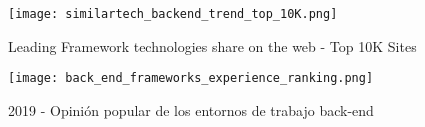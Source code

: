 \begin{figure}
	\centering
	\texttt{[image: similartech\_backend\_trend\_top\_10K.png]}
	\caption{Leading Framework technologies share on the web - Top 10K Sites}
	\label{fig:similartech:backend}
\end{figure}

\begin{figure}
	\centering
	\texttt{[image: back\_end\_frameworks\_experience\_ranking.png]}
	\caption{2019 - Opinión popular de los entornos de trabajo back-end}
	\label{fig:stjs2019:backend}
\end{figure}
